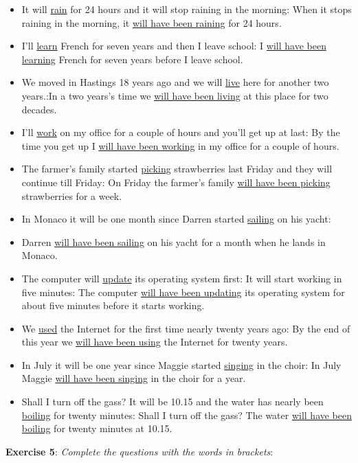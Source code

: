 \begin{itemize}

\item It will \underline{rain} for 24 hours and it will stop raining in the morning: When it stops raining in the morning, it \underline{will have been raining} for 24 hours. 
\item I'll \underline{learn} French for seven years and then I leave school: I \underline{will have been learning} French for seven years before I leave school.
\item We moved in Hastings 18 years ago and we will \underline{live} here for another two years.:In a two years's time we \underline{will have been living} at this place for two decades.
\item I'll \underline{work} on my office for a couple of hours and you'll get up at last: By the time you get up I \underline{will have been working} in my office for a couple of hours. 
\item The farmer's family started \underline{picking} strawberries last Friday and they will continue till Friday: On Friday the farmer's family \underline{will have been picking} strawberries for a week.
\item In Monaco it will be one month since Darren started \underline{sailing} on his yacht: \item Darren \underline{will have been sailing} on his yacht for a month when he lands in Monaco.
\item The computer will \underline{update} its operating system first: It will start working in five minutes: The computer \underline{will have been updating} its operating system for about five minutes before it starts working.
\item We \underline{used} the Internet for the first time nearly twenty years ago: By the end of this year we \underline{will have been using} the Internet for twenty years.
\item In July it will be one year since Maggie started \underline{singing} in the choir: In July Maggie \underline{will have been singing} in the choir for a year. 
\item Shall I turn off the gass? It will be 10.15 and the water has nearly been \underline{boiling} for twenty minutes: Shall I turn off the gass? The water \underline{will have been boiling} for twenty 
minutes at 10.15.

\end{itemize}

\textbf{Exercise 5}: \textit{Complete the questions with the words in brackets}:

